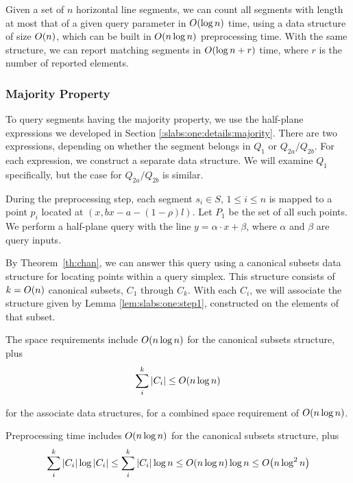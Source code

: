 \begin{lemma}
\label{lem:slabs:one:step1}
Given a set of $n$ horizontal line segments, we can count all segments with length at most that of a given query parameter in $O\!\left(\log{n}\right)$ time, using a data structure of size $O\!\left(n\right)$, which can be built in $O\!\left(n \log{n}\right)$ preprocessing time. With the same structure, we can report matching segments in $O\!\left(\log{n} + r\right)$ time, where $r$ is the number of reported elements.
\end{lemma}


\subsubsection{Majority Property}

To query segments having the majority property, we use the half-plane expressions we developed in Section \ref{:slabs:one:details:majority}.  There are two expressions, depending on whether the segment belongs in $Q_1$ or $Q_{2a}/Q_{2b}$. For each expression, we construct a separate data structure. We will examine $Q_1$ specifically, but the case for $Q_{2a}/Q_{2b}$ is similar.

During the preprocessing step, each segment $s_i \in S$, $1 \leq i \leq n$ is mapped to a point $p_i$ located at $(x, bx - a - (1 - \rho)l)$. Let $P_1$ be the set of all such points. We perform a half-plane query with the line $y = \alpha\cdot x + \beta$, where $\alpha$ and $\beta$ are query inputs.

By Theorem~\ref{th:chan}, we can answer this query using a canonical subsets data structure for locating points within a query simplex. This structure consists of $k = O\!\left(n\right)$ canonical subsets, $C_1$ through $C_k$. With each $C_i$, we will associate the structure given by Lemma \ref{lem:slabs:one:step1}, constructed on the elements of that subset.

The space requirements include $O\!\left(n \log{n}\right)$ for the canonical subsets structure, plus
\[
\sum_{i}^{k}{|C_i|} \leq O\!\left(n\log{n}\right)
\]

\noindent for the associate data structures, for a combined space requirement of $O\!\left(n\log{n}\right)$.

Preprocessing time includes $O\!\left(n\log{n}\right)$ for the canonical subsets structure, plus
\[
\sum_{i}^{k}{|C_i| \log{|C_i|}} 
\leq \sum_{i}^{k}{|C_i| \log{n}} 
\leq O\!\left(n\log{n}\right) \log{n} 
\leq O\!\left(n \log^2{n}\right)
\]

